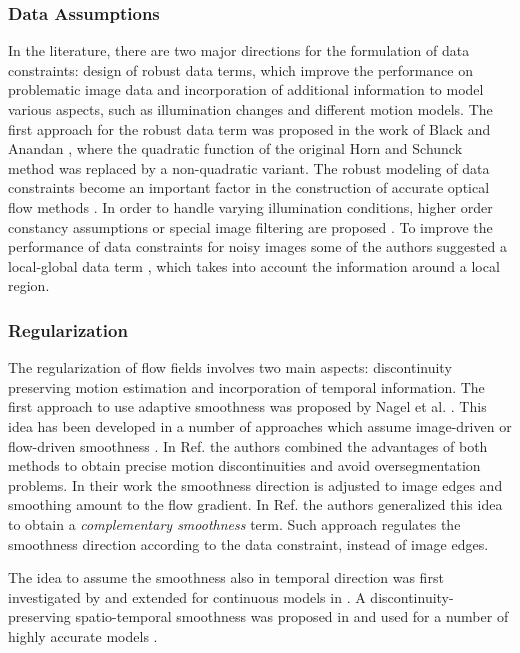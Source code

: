 \subsubsection{Data Assumptions}

In the literature, there are two major directions for the formulation of data constraints: design of robust data terms, which improve the performance on problematic image data and incorporation of additional information to model various aspects, such as illumination changes and different motion models. 
The first approach for the robust data term was proposed in the work of Black and Anandan \cite{Black91, Black96}, where the quadratic function of the original Horn and Schunck method was replaced by a non-quadratic variant. The robust modeling of data constraints become an important factor in the construction of accurate optical flow methods \cite{Brox04, Lempitsky08, Xu10, Middl, Sun14}. 
In order to handle varying illumination conditions,  higher order constancy assumptions \cite{Schnorr93, Schnorr94,  Brox04, Papenberg06, HarmonyFlow} or special image filtering are proposed \cite{Mileva07, Wedel09, HarmonyFlow}. To improve the performance of data constraints for noisy images some of the authors suggested a local-global data term \cite{Bruhn02, Bruhn05a}, which takes into account the information around a local region.  

\subsubsection{Regularization}

The regularization of flow fields involves two main aspects: discontinuity preserving motion estimation and incorporation of temporal information.
The first approach to use adaptive smoothness was proposed by Nagel et al. \cite{Nagel83, Nagel86}. This idea has been developed in a number of approaches which assume image-driven \cite{Schnorr93, Alvarez99} or flow-driven smoothness \cite{Shulman89, Schnorr94}.  In Ref. \cite{Sun08} the authors combined the advantages of both methods to obtain precise motion discontinuities and avoid oversegmentation problems. In their work the smoothness direction is adjusted to image edges and smoothing amount to the flow gradient. In Ref. \cite{HarmonyFlow} the authors generalized this idea to obtain a \textit{complementary smoothness} term.  Such approach regulates the smoothness direction according to the data constraint, instead of image edges.

The idea to assume the smoothness also in temporal direction was first investigated  by \cite{Murray87} and extended for continuous models in \cite{Nagel90}. A discontinuity-preserving spatio-temporal smoothness was proposed in \cite{Weickert2001b} and used for a number of highly accurate \opticalflow models \cite{Brox04, HarmonyFlow, Volz11}.


